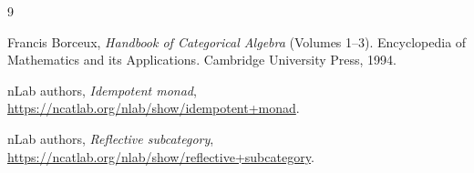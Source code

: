 \documentclass{article}
\begin{document}
\begin{thebibliography}{9}

Francis Borceux,
\textit{Handbook of Categorical Algebra} (Volumes 1--3).
Encyclopedia of Mathematics and its Applications. Cambridge University Press, 1994.

nLab authors,
\textit{Idempotent monad},
\url{https://ncatlab.org/nlab/show/idempotent+monad}.

nLab authors,
\textit{Reflective subcategory},
\url{https://ncatlab.org/nlab/show/reflective+subcategory}.

\end{thebibliography}
\end{document}

